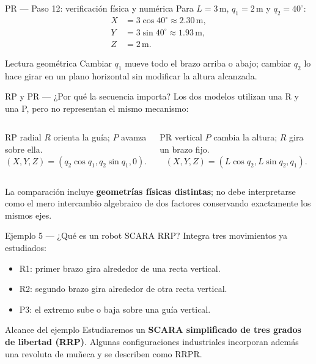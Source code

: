 \documentclass[aspectratio=169,11pt]{beamer}
\begin{document}
\begin{frame}[t]{PR — Paso 12: verificación física y numérica}
 \small
 Para $L=3\,\mathrm m$, $q_1=2\,\mathrm m$ y $q_2=40^\circ$:
 \[
 \boxed{\begin{aligned}
 X&=3\cos40^\circ\approx2.30\,\mathrm m,\\
 Y&=3\sin40^\circ\approx1.93\,\mathrm m,\\
 Z&=2\,\mathrm m.
 \end{aligned}}
 \]
 \pause
 \begin{block}{Lectura geométrica}
 Cambiar $q_1$ mueve todo el brazo arriba o abajo;
 cambiar $q_2$ lo hace girar en un plano horizontal
 sin modificar la altura alcanzada.
 \end{block}
\end{frame}

\begin{frame}[t]{RP y PR — ¿Por qué la secuencia importa?}
 \small
 Los dos modelos utilizan una R y una P,
 pero no representan el mismo mecanismo:
 \begin{columns}[T,onlytextwidth]
 \begin{block}{RP radial}
 $R$ orienta la guía; $P$ avanza sobre ella.
 \[
 (X,Y,Z)=(q_2\cos q_1,q_2\sin q_1,0).
 \]
 \end{block}
 \begin{block}{PR vertical}
 $P$ cambia la altura; $R$ gira un brazo fijo.
 \[
 (X,Y,Z)=(L\cos q_2,L\sin q_2,q_1).
 \]
 \end{block}
 \end{columns}
 \pause
 \small La comparación incluye \textbf{geometrías físicas distintas};
 no debe interpretarse como el mero intercambio algebraico
 de dos factores conservando exactamente los mismos ejes.
\end{frame}

\begin{frame}[t]{Ejemplo 5 — ¿Qué es un robot SCARA RRP?}
 \small
 Integra tres movimientos ya estudiados:
 \begin{itemize}
  \item R1: primer brazo gira alrededor de una recta vertical.
  \item R2: segundo brazo gira alrededor de otra recta vertical.
  \item P3: el extremo sube o baja sobre una guía vertical.
 \end{itemize}
 \pause
 \begin{block}{Alcance del ejemplo}
 Estudiaremos un \textbf{SCARA simplificado de tres grados de libertad
 (RRP)}. Algunas configuraciones industriales incorporan
 además una revoluta de muñeca y se describen como RRPR.
 \end{block}
\end{frame}
\end{document}
